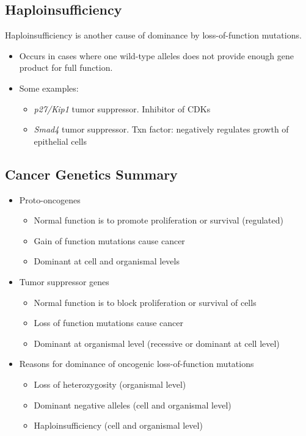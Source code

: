 \documentclass[10pt]{article}
\begin{document}
\subsection*{Haploinsufficiency}
Haploinsufficiency is another cause of dominance by loss-of-function mutations.
\begin{itemize}
	\item Occurs in cases where one wild-type alleles does not provide enough gene product for full function.
	\item Some examples:
	\begin{itemize}
        \item \emph{p27/Kip1} tumor suppressor.  Inhibitor of CDKs
        \item \emph{Smad4} tumor suppressor.  Txn factor: negatively regulates growth of epithelial cells
    \end{itemize}
\end{itemize}

\subsection*{Cancer Genetics Summary}
\begin{itemize}
	\item Proto-oncogenes
	\begin{itemize}
        \item Normal function is to promote proliferation or survival (regulated)
        \item Gain of function mutations cause cancer
        \item Dominant at cell and organismal levels
    \end{itemize}
	\item Tumor suppressor genes
	\begin{itemize}
        \item Normal function is to block proliferation or survival of cells
        \item Loss of function mutations cause cancer
        \item Dominant at organismal level (recessive or dominant at cell level)
    \end{itemize}
	\item Reasons for dominance of oncogenic loss-of-function mutations
	\begin{itemize}
        \item Loss of heterozygosity (organismal level)
        \item Dominant negative alleles (cell and organismal level)
        \item Haploinsufficiency (cell and organismal level)
    \end{itemize}
\end{itemize}
\end{document}
